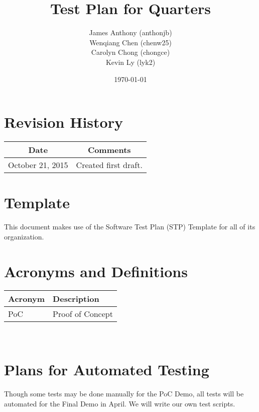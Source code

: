 \documentclass[12pt]{article}
\begin{document}
\title{Test Plan for Quarters} 
\author{James Anthony (anthonjb)\\ Wenqiang Chen (chenw25)\\ Carolyn Chong 
(chongce)\\ Kevin Ly (lyk2)}
\date{\today}
  
\maketitle

\pagebreak

\tableofcontents

\section*{Revision History}
\begin{tabular}{|c|c|}
\hline
\textbf{Date}  & \textbf{Comments} \\ \hline
October 21, 2015 & Created first draft. \\ 
\hline
\end{tabular}

\section*{Template}
This document makes use of the Software Test Plan (STP) Template for all of its organization.

\pagebreak


\section{Acronyms and Definitions}
\renewcommand{\arraystretch}{1.2}
\begin{tabular}{l l} 
  \toprule    
  \textbf{Acronym} & \textbf{Description}\\
  \midrule 
  PoC   &Proof of Concept\\
  \bottomrule
\end{tabular}\\


\section{Plans for Automated Testing}
Though some tests may be done manually for the PoC Demo, all tests will be automated for the Final Demo in April. We will write our own test scripts.
\end{document}
